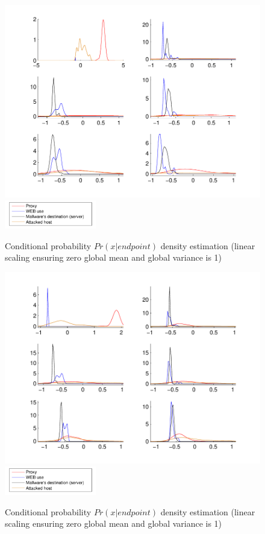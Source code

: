 \documentclass[a4paper]{IEEEtran}
\begin{document}
\begin{figure}[t!]%
  \centering
  \includegraphics[width=140mm]{dens_dst_logp}
      \includegraphics[width=40mm]{legend}
  \caption{Conditional probability $Pr(x|endpoint)$ density estimation (linear scaling ensuring zero global mean and global variance is 1)}
  \label{fig:dens_dst_logp}
\end{figure}
\begin{figure}[t!]%
  \centering
  \includegraphics[width=140mm]{dens_src_bdivp}
    \includegraphics[width=40mm]{legend}
  \caption{Conditional probability $Pr(x|endpoint)$ density estimation (linear scaling ensuring zero global mean and global variance is 1)}
  \label{fig:dens_src_bdivp}
\end{figure}
\end{document}
